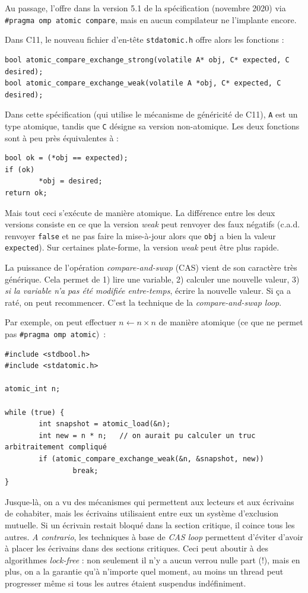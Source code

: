 Au passage, \OMP l'offre dans la version 5.1 de la spécification (novembre 2020)
via \texttt{\#pragma omp atomic compare}, mais en \the\year\xspace aucun compilateur ne
l'implante encore.

Dans \textsf{C11}, le nouveau fichier d'en-tête \texttt{stdatomic.h} offre alors
les fonctions :
\begin{verbatim}
bool atomic_compare_exchange_strong(volatile A* obj, C* expected, C desired);
bool atomic_compare_exchange_weak(volatile A *obj, C* expected, C desired);
\end{verbatim}

Dans cette spécification (qui utilise le mécanisme de généricité de C11),
\texttt{A} est un type atomique, tandis que \texttt{C} désigne sa version
non-atomique. Les deux fonctions sont à peu près équivalentes à :
\begin{verbatim}
bool ok = (*obj == expected);
if (ok)
        *obj = desired;
return ok;
\end{verbatim}
Mais tout ceci s'exécute de manière atomique. La différence entre les deux
versions consiste en ce que la version \emph{weak} peut renvoyer des faux
négatifs (c.a.d. renvoyer \texttt{false} et ne pas faire la mise-à-jour alors
que \texttt{obj} a bien la valeur \texttt{expected}). Sur certaines plate-forme,
la version \emph{weak} peut être plus rapide.

La puissance de l'opération \emph{compare-and-swap} (CAS) vient de son caractère
très générique. Cela permet de 1) lire une variable, 2) calculer une nouvelle
valeur, 3) \emph{si la variable n'a pas été modifiée entre-temps}, écrire la
nouvelle valeur. Si ça a raté, on peut recommencer. C'est la technique de la
\emph{compare-and-swap loop}.

Par exemple, on peut effectuer $n \gets n \times n$ de manière atomique (ce que ne
permet pas \texttt{\#pragma omp atomic})~:
\begin{verbatim}
#include <stdbool.h>
#include <stdatomic.h>
  
atomic_int n;
  
while (true) {
        int snapshot = atomic_load(&n);
        int new = n * n;   // on aurait pu calculer un truc arbitraitement compliqué
        if (atomic_compare_exchange_weak(&n, &snapshot, new))
                break;
}
\end{verbatim}

Jusque-là, on a vu des mécanismes qui permettent aux lecteurs et aux écrivains
de cohabiter, mais les écrivains utilisaient entre eux un système d'exclusion
mutuelle. Si un écrivain restait bloqué dans la section critique, il coince tous
les autres. \textit{A contrario}, les techniques à base de \emph{CAS loop}
permettent d'éviter d'avoir à placer les écrivains dans des sections
critiques. Ceci peut aboutir à des algorithmes \emph{lock-free} : non seulement
il n'y a aucun verrou nulle part (!), mais en plus, on a la garantie qu'à
n'importe quel moment, au moins un thread peut progresser même si tous les
autres étaient suspendus indéfiniment.

